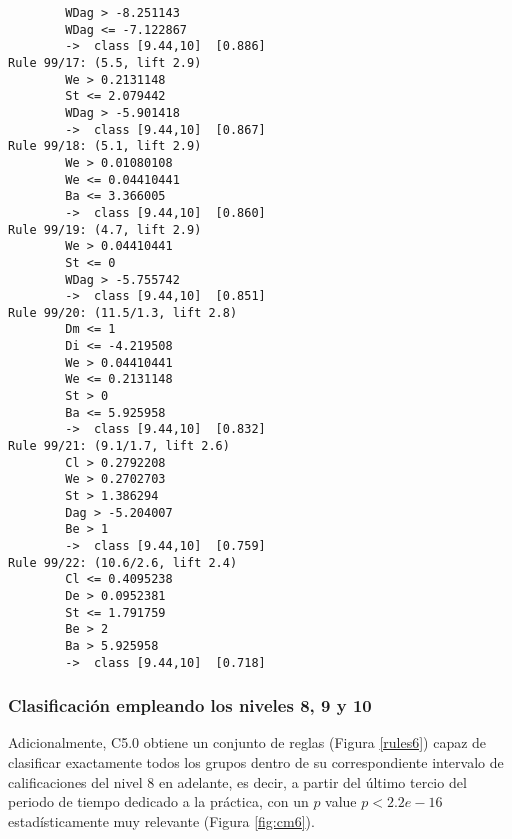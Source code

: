 \begin{tcolorbox}[title=Reglas de clasificación para identificar intervalos de notas.]
\begin{multicols}{3}
\begin{verbatim}
        WDag > -8.251143
        WDag <= -7.122867
        ->  class [9.44,10]  [0.886]
Rule 99/17: (5.5, lift 2.9)
        We > 0.2131148
        St <= 2.079442
        WDag > -5.901418
        ->  class [9.44,10]  [0.867]
Rule 99/18: (5.1, lift 2.9)
        We > 0.01080108
        We <= 0.04410441
        Ba <= 3.366005
        ->  class [9.44,10]  [0.860]
Rule 99/19: (4.7, lift 2.9)
        We > 0.04410441
        St <= 0
        WDag > -5.755742
        ->  class [9.44,10]  [0.851]
Rule 99/20: (11.5/1.3, lift 2.8)
        Dm <= 1
        Di <= -4.219508
        We > 0.04410441
        We <= 0.2131148
        St > 0
        Ba <= 5.925958
        ->  class [9.44,10]  [0.832]
Rule 99/21: (9.1/1.7, lift 2.6)
        Cl > 0.2792208
        We > 0.2702703
        St > 1.386294
        Dag > -5.204007
        Be > 1
        ->  class [9.44,10]  [0.759]
Rule 99/22: (10.6/2.6, lift 2.4)
        Cl <= 0.4095238
        De > 0.0952381
        St <= 1.791759
        Be > 2
        Ba > 5.925958
        ->  class [9.44,10]  [0.718]
    \end{verbatim}
  \end{multicols}
\label{rules5}
\end{tcolorbox}

\subsubsection{Clasificación empleando los niveles 8, 9 y 10}

Adicionalmente, C5.0 obtiene un conjunto de reglas (Figura \ref{rules6}) capaz de clasificar exactamente todos los grupos dentro de su correspondiente intervalo de calificaciones del nivel $8$ en adelante, es decir, a partir del último tercio del periodo de tiempo dedicado a la práctica, con un $p$ value $p < 2.2e-16$ estadísticamente muy relevante (Figura \ref{fig:cm6}).

